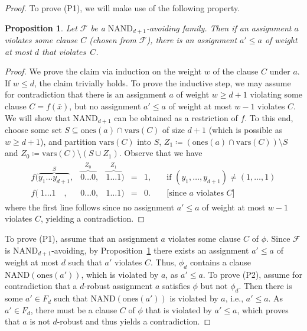 \documentclass[10pt,a4paper]{article}
\theoremstyle{plain}
\newtheorem{prop}[thm]{Proposition}
\newcommand{\NAND}{\mathrm{NAND}}
\newcommand{\confam}{\mathcal{F}}
\newcommand{\vars}{\mathrm{vars}}
\newcommand{\ones}{\mathrm{ones}}
\newcommand{\entry}[1]{#1 \dots #1}
\newcommand{\cqed}{}
\begin{document}
  \begin{proof}
  To prove (P1), we will make use of the following property.
  \begin{prop}\label{prop:NANDd1}
  Let $\confam$ be a $\NAND_{d+1}$-avoiding family. Then if an assignment $a$ violates some clause $C$ (chosen from $\confam$), there is an assignment $a' \le a$ of weight at most $d$ that violates~$C$.
  \end{prop}
  \begin{proof}
  We prove the claim via induction on the weight $w$ of the clause $C$ under $a$. If $w \le d$, the claim trivially holds. To prove the inductive step, we may assume for contradiction that there is an assignment $a$ of weight $w\ge d+1$ violating some clause $C=f(\bar{x})$, but no assignment $a' \le a$ of weight at most $w-1$ violates $C$. We will show that $\NAND_{d+1}$ can be obtained as a restriction of $f$. 
  To this end, choose some set $S \subseteq \ones(a) \cap \vars(C)$ of size $d+1$ (which is possible as $w\ge d+1$), and partition $\vars(C)$ into $S$, $Z_1 \coloneqq (\ones(a) \cap \vars(C)) \setminus S$ and $Z_0 \coloneqq \vars(C) \setminus (S\cup Z_1)$. Observe that we have   
  \begin{align*}
  \begin{matrix}
f( \overbrace{y_1\dots y_{d+1}}^{S},& \overbrace{\entry{0}}^{Z_0}, & \overbrace{\entry{1}}^{Z_1}) & = & 1, & \quad \text{if $(y_1,\dots,y_{d+1})\ne (1,\dots, 1)$}\\
  \hline
f( \; \entry{1}\quad,& \entry{0}, & \entry{1}) & = & 0. & \quad\text{[since $a$ violates $C$]}
    \end{matrix}
    \end{align*}
    where the first line follows since no assignment $a' \le a$ of weight at most $w-1$ violates $C$, yielding a contradiction.
  
  \cqed \end{proof}
  To prove (P1), assume that an assignment $a$ violates some clause $C$ of $\phi$. Since $\confam$ is $\NAND_{d+1}$-avoiding, by Proposition~\ref{prop:NANDd1} there exists an assignment $a'\le a$ of weight at most $d$ such that $a'$ violates $C$. Thus, $\phi_d$ contains a clause $\NAND(\ones(a'))$, which is violated by $a$, as $a' \le a$.
%
  To prove (P2), assume for contradiction that a $d$-robust assignment $a$ satisfies $\phi$ but not $\phi_d$. Then there is some $a' \in F_d$ such that $\NAND(\ones(a'))$ is violated by $a$, i.e., $a' \le a$. As $a' \in F_d$, there must be a clause $C$ of $\phi$ that is violated by $a'\le a$, which proves that $a$ is not $d$-robust and thus yields a contradiction.
  \end{proof}
\end{document}

